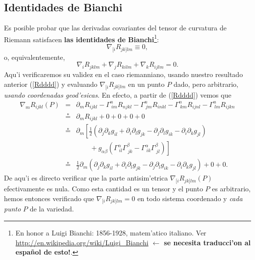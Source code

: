 \subsection{Identidades de Bianchi}
Es posible probar que las derivadas covariantes del tensor de curvatura de Riemann
satisfacen \textbf{las identidades de Bianchi}\footnote{En honor a Luigi Bianchi: 1856-1928, matem'atico italiano. Ver \url{http://en.wikipedia.org/wiki/Luigi_Bianchi}  \textbf{$\leftarrow$ se necesita traducci'on al espa\~nol de esto!}.}:
\begin{equation}
\boxed{\nabla_{\lbrack i}R_{jk]l m}\equiv 0,}
\end{equation}
o, equivalentemente,
\begin{equation}
 \nabla_iR_{jklm}+\nabla_jR_{kilm}+\nabla_kR_{ijlm}=0. \label{Bi2}
\end{equation}
Aqu'i verificaremos su validez en el caso riemanniano, usando nuestro resultado anterior (\ref{Rdddd}) y evaluando $\nabla_{\lbrack i}R_{jk]l m}$ en un punto $P$ dado, pero arbitrario, \textit{usando coordenadas geod'esicas}. En efecto, a partir de (\ref{Rdddd}) vemos que
\begin{eqnarray}
 \nabla_mR_{ijkl}(P)&=&\partial_mR_{ijkl}-\Gamma^n_{\ im} R_{njkl}-\Gamma^n_{\ jm} R_{inkl}-\Gamma^n_{\ km} R_{ijnl}-\Gamma^n_{\ lm} R_{ijkn}\\
&\stackrel{*}{=}&\partial_mR_{ijkl}+0+0+0+0\\
&\stackrel{*}{=}&\partial_m\left[\frac{1}{2}\left(\partial_j\partial_kg_{il}+\partial_i\partial_lg_{jk}-\partial_j\partial_lg_{ik}-\partial_i\partial_kg_{jl}\right) \right. \nonumber\\
& &  \qquad + \left. g_{\alpha\beta}\left(\Gamma^\alpha_{\ il}\Gamma^\beta_{\ jk}-\Gamma^\alpha_{\ ik}\Gamma^\beta_{\ jl}\right)\right]\\
&\stackrel{*}{=}&\frac{1}{2}\partial_m\left(\partial_j\partial_kg_{il}+\partial_i\partial_lg_{jk}-\partial_j\partial_lg_{ik}-\partial_i\partial_kg_{jl}\right) + 0 +0.
\end{eqnarray}
De aqu'i es directo verificar que la parte antisim'etrica $\nabla_{\lbrack i}R_{jk]l m}(P)$ efectivamente es nula. Como esta cantidad es un tensor y el punto $P$ es arbitrario, hemos entonces verificado que $\nabla_{\lbrack i}R_{jk]l m}=0$ en todo sistema coordenado y \textit{cada punto} $P$ de la variedad.

